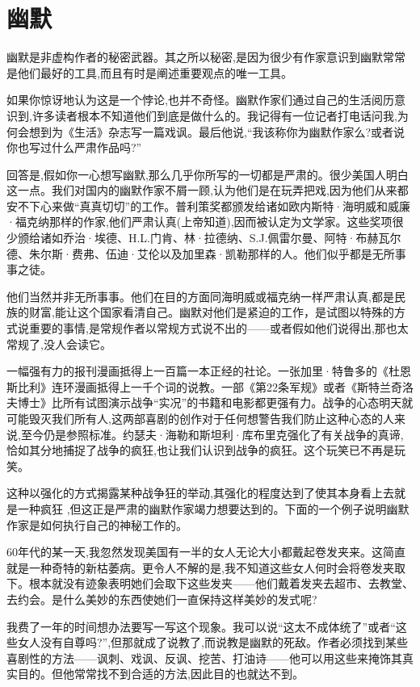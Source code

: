 \chapter{幽默}
幽默是非虚构作者的秘密武器。其之所以秘密,是因为很少有作家意识到幽默常常是他们最好的工具,而且有时是阐述重要观点的唯一工具。

如果你惊讶地认为这是一个悖论,也并不奇怪。幽默作家们通过自己的生活阅历意识到,许多读者根本不知道他们到底是做什么的。我记得有一位记者打电话问我,为何会想到为《生活》杂志写一篇戏讽。最后他说,“我该称你为幽默作家么?或者说你也写过什么严肃作品吗?”

回答是,假如你一心想写幽默,那么几乎你所写的一切都是严肃的。很少美国人明白这一点。我们对国内的幽默作家不屑一顾,认为他们是在玩弄把戏,因为他们从来都安不下心来做“真真切切”的工作。普利策奖都颁发给诸如欧内斯特·海明威和威廉·福克纳那样的作家,他们严肃认真(上帝知道),因而被认定为文学家。这些奖项很少颁给诸如乔治·埃德、H.L.门肯、林·拉德纳、S.J.佩雷尔曼、阿特·布赫瓦尔德、朱尔斯·费弗、伍迪·艾伦以及加里森·凯勒那样的人。他们似乎都是无所事事之徒。

他们当然并非无所事事。他们在目的方面同海明威或福克纳一样严肃认真,都是民族的财富,能让这个国家看清自己。幽默对他们是紧迫的工作，是试图以特殊的方式说重要的事情,是常规作者以常规方式说不出的——或者假如他们说得出,那也太常规了,没人会读它。

一幅强有力的报刊漫画抵得上一百篇一本正经的社论。一张加里·特鲁多的《杜恩斯比利》连环漫画抵得上一千个词的说教。一部《第22条军规》或者《斯特兰奇洛夫博士》比所有试图演示战争“实况”的书籍和电影都更强有力。战争的心态明天就可能毁灭我们所有人,这两部喜剧的创作对于任何想警告我们防止这种心态的人来说,至今仍是参照标准。约瑟夫·海勒和斯坦利·库布里克强化了有关战争的真谛,恰如其分地捕捉了战争的疯狂,也让我们认识到战争的疯狂。这个玩笑已不再是玩笑。

这种以强化的方式揭露某种战争狂的举动,其强化的程度达到了使其本身看上去就是一种疯狂 ,但这正是严肃的幽默作家竭力想要达到的。下面的一个例子说明幽默作家是如何执行自己的神秘工作的。

60年代的某一天,我忽然发现美国有一半的女人无论大小都戴起卷发夹来。这简直就是一种奇特的新枯萎病。更令人不解的是,我不知道这些女人何时会将卷发夹取下。根本就没有迹象表明她们会取下这些发夹——他们戴着发夹去超市、去教堂、去约会。是什么美妙的东西使她们一直保持这样美妙的发式呢?

我费了一年的时间想办法要写一写这个现象。我可以说“这太不成体统了”或者“这些女人没有自尊吗?”,但那就成了说教了,而说教是幽默的死敌。作者必须找到某些喜剧性的方法——讽刺、戏讽、反讽、挖苦、打油诗——他可以用这些来掩饰其真实目的。但他常常找不到合适的方法,因此目的也就达不到。

